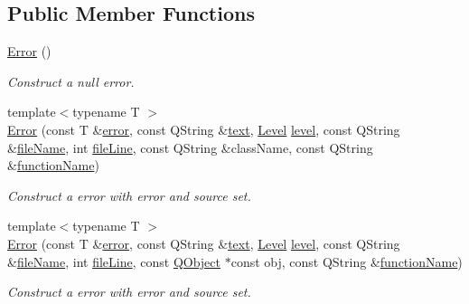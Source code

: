 \subsection*{Public Member Functions}
\begin{DoxyCompactItemize}
\item 
\hyperlink{class_mdt_1_1_error_af7cd5683888bc46f9a484670f02520d5}{Error} ()
\begin{DoxyCompactList}\small\item\em Construct a null error. \end{DoxyCompactList}\item 
{\footnotesize template$<$typename T $>$ }\\\hyperlink{class_mdt_1_1_error_ad12894ddf0783443f8351371b701ca89}{Error} (const T \&\hyperlink{class_mdt_1_1_error_a0d042250a76d0351b8c19367572f5e11}{error}, const Q\+String \&\hyperlink{class_mdt_1_1_error_a99327678615e8f2bddd22cd59482bfc2}{text}, \hyperlink{class_mdt_1_1_error_ab533dc690f68a8635232db594194a068}{Level} \hyperlink{class_mdt_1_1_error_a9c73117a49791ab87163b815d6a3e0c9}{level}, const Q\+String \&\hyperlink{class_mdt_1_1_error_a5f7cdab03c2c0955693ace234039cd53}{file\+Name}, int \hyperlink{class_mdt_1_1_error_a5b887edc31341eb23557905e7a2d69ae}{file\+Line}, const Q\+String \&class\+Name, const Q\+String \&\hyperlink{class_mdt_1_1_error_a5706a74669219d9672ee20414f805cab}{function\+Name})
\begin{DoxyCompactList}\small\item\em Construct a error with error and source set. \end{DoxyCompactList}\item 
{\footnotesize template$<$typename T $>$ }\\\hyperlink{class_mdt_1_1_error_a8643711dcae19d29e332b10b5420dd21}{Error} (const T \&\hyperlink{class_mdt_1_1_error_a0d042250a76d0351b8c19367572f5e11}{error}, const Q\+String \&\hyperlink{class_mdt_1_1_error_a99327678615e8f2bddd22cd59482bfc2}{text}, \hyperlink{class_mdt_1_1_error_ab533dc690f68a8635232db594194a068}{Level} \hyperlink{class_mdt_1_1_error_a9c73117a49791ab87163b815d6a3e0c9}{level}, const Q\+String \&\hyperlink{class_mdt_1_1_error_a5f7cdab03c2c0955693ace234039cd53}{file\+Name}, int \hyperlink{class_mdt_1_1_error_a5b887edc31341eb23557905e7a2d69ae}{file\+Line}, const \hyperlink{class_q_object}{Q\+Object} $\ast$const obj, const Q\+String \&\hyperlink{class_mdt_1_1_error_a5706a74669219d9672ee20414f805cab}{function\+Name})
\begin{DoxyCompactList}\small\item\em Construct a error with error and source set. \end{DoxyCompactList}\item 

\end{DoxyCompactItemize}
